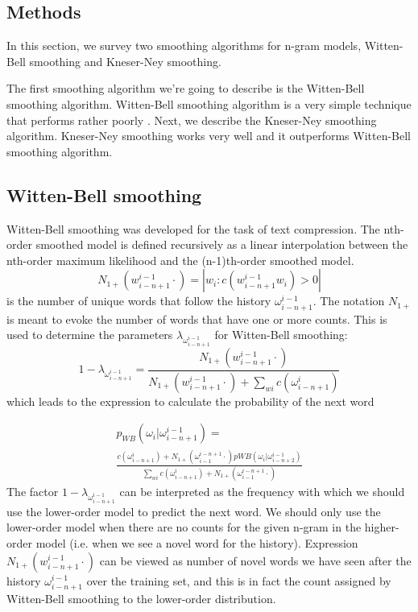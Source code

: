 \documentclass[twoside]{article}
\begin{document}
\begin{multicols}{2}
\section{Methods}

In this section, we survey two smoothing algorithms for n-gram models, Witten-Bell smoothing and Kneser-Ney smoothing. 

The first smoothing algorithm we\rq{}re going to describe is the Witten-Bell smoothing algorithm. Witten-Bell smoothing algorithm is a very simple technique that performs rather poorly \cite{1_chen1999empirical}. Next, we describe the Kneser-Ney smoothing algorithm. Kneser-Ney smoothing works very well and it outperforms Witten-Bell smoothing algorithm.

\subsection{Witten-Bell smoothing}
Witten-Bell smoothing was developed for the task of text compression. The nth-order smoothed model is defined recursively as a linear interpolation between the nth-order maximum likelihood and the (n-1)th-order smoothed model. 
\begin{equation}
N_{1+}(w_{i-n+1}^{i-1}\cdot) = |{w_{i} : c(w_{i-n+1}^{i-1}w_{i}) > 0}|
\end{equation}
is the number of unique words that follow the history $ \omega_{i-n+1}^{i-1} $.
The notation $N_{1+}$ is meant to evoke the number of words that have one or more counts.
This is used to determine the parameters $ \lambda_{\omega_{i-n+1}^{i-1}} $  for Witten-Bell smoothing:
\begin{equation}
1-\lambda_{\omega_{i-n+1}^{i-1}}=\frac{N_{1+}(w_{i-n+1}^{i-1}\cdot)}{N_{1+}(w_{i-n+1}^{i-1}\cdot) + \sum_{wi}c(\omega_{i-n+1}^{i})}
\end{equation}
which leads to the expression to calculate the probability of the next word 

\begin{multline}
p_{WB}(\omega_i|\omega_{i-n+1}^{i-1})= \\ \frac{c(\omega_{i-n+1}^{i}) + N_{1+}(\omega_{i-1}^{i-n+1}\cdot)p{WB}(\omega_i|\omega_{i-n+2}^{i-1})}{\sum_{wi}c(\omega_{i-n+1}^{i}) + N_{1+}(\omega_{i-1}^{i-n+1}\cdot)}
\end{multline}
The factor $ 1-\lambda_{\omega_{i-n+1}^{i-1}} $ can be interpreted as the frequency with which we should use the lower-order model to predict the next word. We should only use the lower-order model when there are no counts for the given n-gram in the higher-order model (i.e. when we see a novel word for the history). Expression $ N_{1+}(w_{i-n+1}^{i-1}\cdot) $ can be viewed as number of novel words we have seen after the history $ \omega_{i-n+1}^{i-1} $ over the training set, and this is in fact the count assigned by Witten-Bell smoothing to the lower-order distribution.


\end{multicols}
\end{document}
